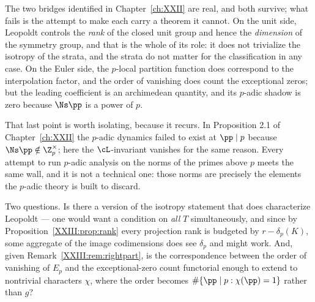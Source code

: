 The two bridges identified in Chapter~\ref{ch:XXII} are real, and both survive; what fails is the
attempt to make each carry a theorem it cannot. On the unit side, Leopoldt controls the
\emph{rank} of the closed unit group and hence the \emph{dimension} of the symmetry group,
and that is the whole of its role: it does not trivialize the isotropy of the strata, and the
strata do not matter for the classification in any case. On the Euler side, the $p$-local
partition function does correspond to the interpolation factor, and the order of vanishing
does count the exceptional zeros; but the leading coefficient is an archimedean quantity, and
its $p$-adic shadow is zero because $\Ns\pp$ is a power of $p$.

That last point is worth isolating, because it recurs. In Proposition 2.1 of Chapter~\ref{ch:XXII} the
$p$-adic dynamics failed to exist at $\pp\mid p$ because $\Ns\pp\notin\Z_p^\times$; here the
$\cL$-invariant vanishes for the same reason. Every attempt to run $p$-adic analysis on the
norms of the primes above $p$ meets the same wall, and it is not a technical one: those norms
are precisely the elements the $p$-adic theory is built to discard.

Two questions. Is there a version of the isotropy statement that does characterize Leopoldt
--- one would want a condition on \emph{all} $T$ simultaneously, and since by
Proposition~\ref{XXIII:prop:rank} every projection rank is budgeted by $r-\delta_p(K)$, some
aggregate of the image codimensions does see $\delta_p$ and might work. And, given Remark~\ref{XXIII:rem:rightpart}, is the correspondence
between the order of vanishing of $E_p$ and the exceptional-zero count functorial enough to
extend to nontrivial characters $\chi$, where the order becomes
$\#\{\pp\mid p:\chi(\pp)=1\}$ rather than $g$?

